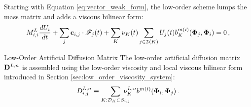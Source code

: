 Starting with Equation \eqref{eq:vector_weak_form}, the low-order scheme
lumps the mass matrix and adds a viscous bilinear form:
\begin{equation}
   M^L_{i,i}\frac{dU_i}{dt}
     + \sum\limits_j\mathbf{c}_{i,j}\cdot\mathscr{F}_j(t)
     + \sum\limits_{K}\nu_K(t)
       \sum\limits_{j\in\mathcal{I}(K)}
         U_j(t)b^{m(i)}_K
           (\mathbf{\Phi}_j, \mathbf{\Phi}_i)
     = 0 \,,
\end{equation}
\begin{definition}{Low-Order Artificial Diffusion Matrix}
   The low-order artificial diffusion matrix $\loworderdiffusionmatrix[\timeindex]$
   is assembled using the low-order viscosity and local viscous bilinear
   form introduced in Section \ref{sec:low_order_viscosity_system}:
   \begin{equation}\label{eq:low_order_diffusion_matrix_system}
     \diffusionmatrixletter\ij^{L,\timeindex} \equiv
       \sumKSij\mkern-20mu\lowordercellviscosity[\timeindex]
       \localvisc^{\componentindex(i)}(\vectortestfunction_i,
         \vectortestfunction_j)
     \eqp
   \end{equation}
\end{definition}
